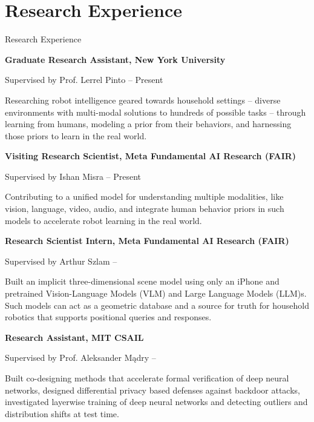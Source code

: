 \section{Research Experience}
{Research Experience}

{\textbf{Graduate Research Assistant, New York University}}
\par 
{Supervised by Prof. Lerrel Pinto}
\hfill
{ --
Present}
\SmallEntryGap
\begin{detail}
Researching robot intelligence geared towards household settings -- diverse environments with multi-modal solutions to hundreds of possible tasks -- through learning from humans, modeling a prior from their behaviors, and harnessing those priors to learn in the real world.
\end{detail}
\SmallEntryGap
{\textbf{Visiting Research Scientist, Meta Fundamental AI Research (FAIR)}}
\par 
{Supervised by Ishan Misra}
\hfill
{ --
Present}
\SmallEntryGap
\begin{detail}
Contributing to a unified model for understanding multiple modalities, like vision, language, video, audio, and integrate human behavior priors in such models to accelerate robot learning in the real world.
\end{detail}
\SmallEntryGap
{\textbf{Research Scientist Intern, Meta Fundamental AI Research (FAIR)}}
\par 
{Supervised by Arthur Szlam}
\hfill
{ --
}
\SmallEntryGap
\begin{detail}
Built an implicit three-dimensional scene model using only an iPhone and pretrained Vision-Language Models (VLM) and Large Language Models (LLM)s. Such models can act as a geometric database and a source for truth for household robotics that supports positional queries and responses.
\end{detail}
\SmallEntryGap
{\textbf{Research Assistant, MIT CSAIL}}
\par 
{Supervised by Prof. Aleksander M\k{a}dry}
\hfill
{ --
}
\SmallEntryGap
\begin{detail}
Built co-designing methods that accelerate formal verification of deep neural networks, designed differential privacy based defenses against backdoor attacks, investigated layerwise training of deep neural networks and detecting outliers and distribution shifts at test time.
\end{detail}